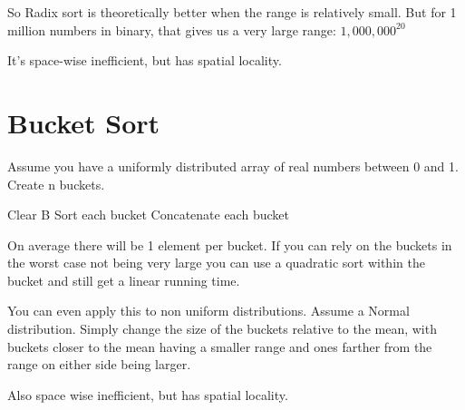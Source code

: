 \documentclass[english, 10pt]{article}
\begin{document}
So Radix sort is theoretically better when the range is relatively small. But
for 1 million numbers in binary, that gives us a very large range:
$1,000,000^{20}$

It's space-wise inefficient, but has spatial locality.

\section{Bucket Sort}

Assume you have a uniformly distributed array of real numbers between 0 and 1.
Create n buckets.

\begin{algorithm}
    Clear B\;
    Sort each bucket\;
    Concatenate each bucket\;
\end{algorithm}

On average there will be 1 element per bucket. If you can rely on the buckets
in the worst case not being very large you can use a quadratic sort within the
bucket and still get a linear running time.

You can even apply this to non uniform distributions. Assume a Normal
distribution. Simply change the size of the buckets relative to the mean, with
buckets closer to the mean having a smaller range and ones farther from the
range on either side being larger.

Also space wise inefficient, but has spatial locality.


\end{document}

